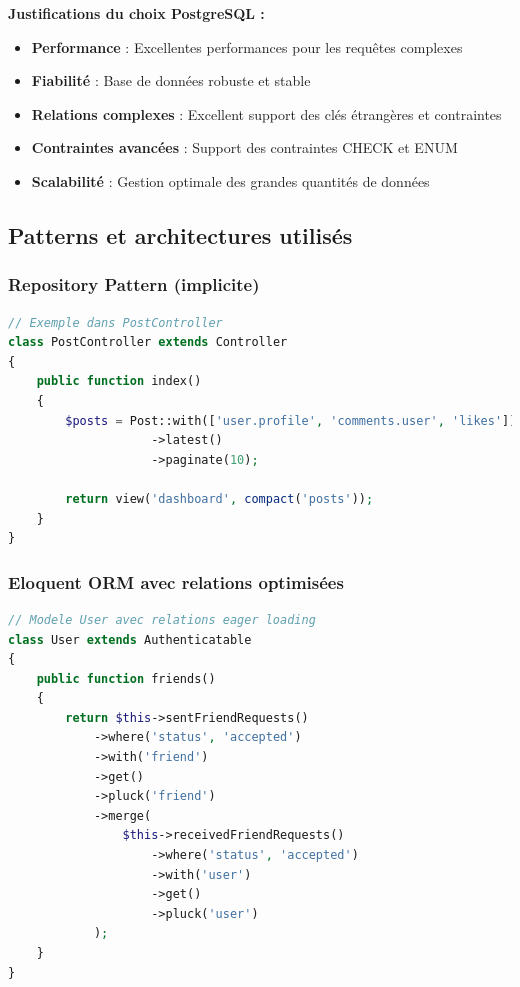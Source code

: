\documentclass[12pt,a4paper]{article}
\begin{document}
\textbf{Justifications du choix PostgreSQL :}
\begin{itemize}
    \item \textbf{Performance} : Excellentes performances pour les requ\^etes complexes
    \item \textbf{Fiabilit\'e} : Base de donn\'ees robuste et stable
    \item \textbf{Relations complexes} : Excellent support des cl\'es \'etrang\`eres et contraintes
    \item \textbf{Contraintes avanc\'ees} : Support des contraintes CHECK et ENUM
    \item \textbf{Scalabilit\'e} : Gestion optimale des grandes quantit\'es de donn\'ees
\end{itemize}

\subsection{Patterns et architectures utilis\'es}

\subsubsection{Repository Pattern (implicite)}
\begin{lstlisting}[language=PHP]
// Exemple dans PostController
class PostController extends Controller
{
    public function index()
    {
        $posts = Post::with(['user.profile', 'comments.user', 'likes'])
                    ->latest()
                    ->paginate(10);
                    
        return view('dashboard', compact('posts'));
    }
}
\end{lstlisting}

\subsubsection{Eloquent ORM avec relations optimis\'ees}
\begin{lstlisting}[language=PHP]
// Modele User avec relations eager loading
class User extends Authenticatable
{
    public function friends()
    {
        return $this->sentFriendRequests()
            ->where('status', 'accepted')
            ->with('friend')
            ->get()
            ->pluck('friend')
            ->merge(
                $this->receivedFriendRequests()
                    ->where('status', 'accepted')
                    ->with('user')
                    ->get()
                    ->pluck('user')
            );
    }
}
\end{lstlisting}
\end{document}
